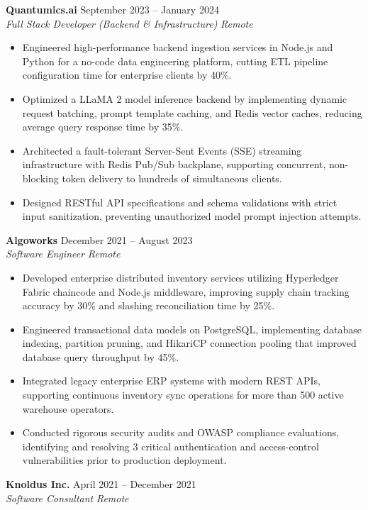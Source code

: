 \documentclass[10pt,a4paper]{article}
\newcommand{\jobheading}[4]{
  \textbf{#1} \hfill #2\\
  \textit{#3} \hfill \textit{#4}\\[-2pt]
}
\begin{document}
\medskip

\jobheading
  {Quantumics.ai}
  {September 2023 -- January 2024}
  {Full Stack Developer (Backend \& Infrastructure)}
  {Remote}

\begin{itemize}
  \item Engineered high-performance backend ingestion services in Node.js and Python for a no-code data engineering platform, cutting ETL pipeline configuration time for enterprise clients by 40\%.
  \item Optimized a LLaMA 2 model inference backend by implementing dynamic request batching, prompt template caching, and Redis vector caches, reducing average query response time by 35\%.
  \item Architected a fault-tolerant Server-Sent Events (SSE) streaming infrastructure with Redis Pub/Sub backplane, supporting concurrent, non-blocking token delivery to hundreds of simultaneous clients.
  \item Designed RESTful API specifications and schema validations with strict input sanitization, preventing unauthorized model prompt injection attempts.
\end{itemize}

\medskip

\jobheading
  {Algoworks}
  {December 2021 -- August 2023}
  {Software Engineer}
  {Remote}

\begin{itemize}
  \item Developed enterprise distributed inventory services utilizing Hyperledger Fabric chaincode and Node.js middleware, improving supply chain tracking accuracy by 30\% and slashing reconciliation time by 25\%.
  \item Engineered transactional data models on PostgreSQL, implementing database indexing, partition pruning, and HikariCP connection pooling that improved database query throughput by 45\%.
  \item Integrated legacy enterprise ERP systems with modern REST APIs, supporting continuous inventory sync operations for more than 500 active warehouse operators.
  \item Conducted rigorous security audits and OWASP compliance evaluations, identifying and resolving 3 critical authentication and access-control vulnerabilities prior to production deployment.
\end{itemize}

\medskip

\jobheading
  {Knoldus Inc.}
  {April 2021 -- December 2021}
  {Software Consultant}
  {Remote}
\end{document}
